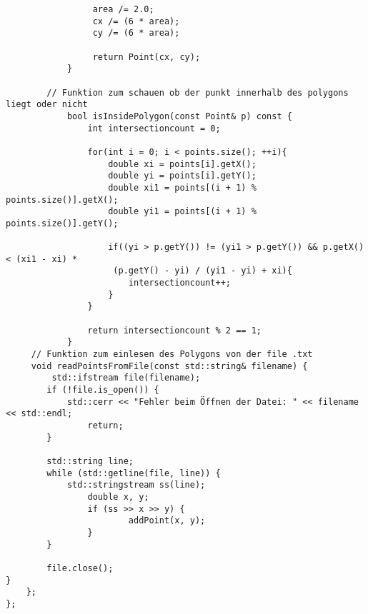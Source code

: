 \documentclass{article}
\begin{document}
\begin{verbatim}
		         area /= 2.0;
		         cx /= (6 * area);
		         cy /= (6 * area);

		         return Point(cx, cy);
			}

		// Funktion zum schauen ob der punkt innerhalb des polygons liegt oder nicht
			bool isInsidePolygon(const Point& p) const {
				int intersectioncount = 0;

				for(int i = 0; i < points.size(); ++i){
					double xi = points[i].getX();
					double yi = points[i].getY();
					double xi1 = points[(i + 1) % points.size()].getX();
					double yi1 = points[(i + 1) % points.size()].getY();

					if((yi > p.getY()) != (yi1 > p.getY()) && p.getX() < (xi1 - xi) *
					 (p.getY() - yi) / (yi1 - yi) + xi){
						intersectioncount++;
					}
				}

				return intersectioncount % 2 == 1;
			}
	 // Funktion zum einlesen des Polygons von der file .txt
	 void readPointsFromFile(const std::string& filename) {
		 std::ifstream file(filename);
		if (!file.is_open()) {
			std::cerr << "Fehler beim Öffnen der Datei: " << filename << std::endl;
				return;
		}

		std::string line;
		while (std::getline(file, line)) {
			std::stringstream ss(line);
				double x, y;
				if (ss >> x >> y) {
						addPoint(x, y);
				}
		}

		file.close();
}
	};
};
\end{verbatim}
\end{document}
